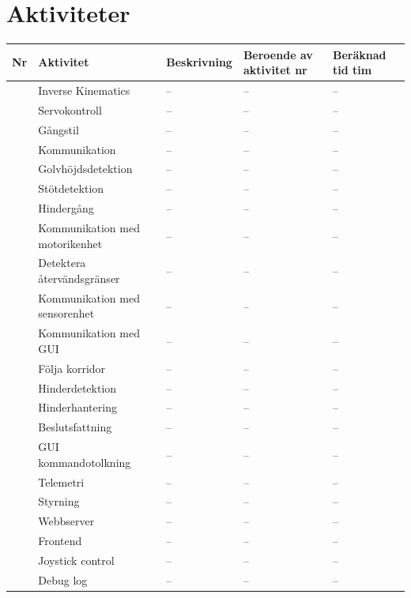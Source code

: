 \documentclass[a4paper,titlepage,12pt]{article}
\newcounter{aktNr}
\newcommand{\nextAktNr}{\stepcounter{aktNr}\arabic{aktNr}}
\begin{document}
	\section{Aktiviteter}
	\begin{longtable}[c]{ c l l l l}
		\textbf{Nr} & \textbf{Aktivitet} & \textbf{Beskrivning} & \textbf{Beroende av aktivitet nr} & \textbf{Beräknad tid tim} \\ \midrule
		\nextAktNr{} & Inverse Kinematics & -- & -- & -- \\ \midrule
		\nextAktNr{} & Servokontroll & -- & -- & -- \\ \midrule
		\nextAktNr{} & Gångstil & -- & -- & -- \\ \midrule
		\nextAktNr{} & Kommunikation & -- & -- & -- \\ \midrule
		\nextAktNr{} & Golvhöjdsdetektion & -- & -- & -- \\ \midrule
		\nextAktNr{} & Stötdetektion & -- & -- & -- \\ \midrule
		\nextAktNr{} & Hindergång & -- & -- & -- \\ \midrule
		\nextAktNr{} & Kommunikation med motorikenhet & -- & -- & -- \\ \midrule
		\nextAktNr{} & Detektera återvändsgränser & -- & -- & -- \\ \midrule
		\nextAktNr{} & Kommunikation med sensorenhet & -- & -- & -- \\ \midrule
		\nextAktNr{} & Kommunikation med GUI & -- & -- & -- \\ \midrule
		\nextAktNr{} & Följa korridor & -- & -- & -- \\ \midrule
		\nextAktNr{} & Hinderdetektion & -- & -- & -- \\ \midrule
		\nextAktNr{} & Hinderhantering & -- & -- & -- \\ \midrule
		\nextAktNr{} & Beslutsfattning & -- & -- & -- \\ \midrule
		\nextAktNr{} & GUI kommandotolkning & -- & -- & -- \\ \midrule
		\nextAktNr{} & Telemetri & -- & -- & -- \\ \midrule
		\nextAktNr{} & Styrning & -- & -- & -- \\ \midrule
		\nextAktNr{} & Webbserver & -- & -- & -- \\ \midrule
		\nextAktNr{} & Frontend & -- & -- & -- \\ \midrule
		\nextAktNr{} & Joystick control & -- & -- & -- \\ \midrule
		\nextAktNr{} & Debug log & -- & -- & -- \\ \midrule

\end{longtable}
\end{document}
